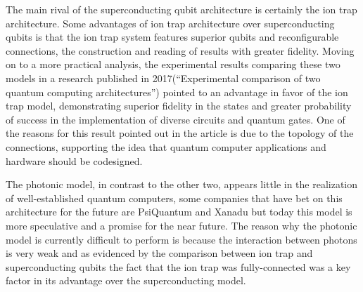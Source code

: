 \documentclass[
  journal=largetwo,
  year=2023,
]{cup-journal}
\begin{document}
The main rival of the superconducting qubit architecture is certainly the ion trap architecture. Some advantages of ion trap architecture over superconducting qubits is that the ion trap system features superior qubits and reconfigurable connections, the construction and reading of results with greater fidelity. Moving on to a more practical analysis, the experimental results comparing these two models in a research published in 2017(``Experimental comparison of two quantum computing architectures'') pointed to an advantage in favor of the ion trap model, demonstrating superior fidelity in the states and greater probability of success in the implementation of diverse circuits and quantum gates. One of the reasons for this result pointed out in the article is due to the topology of the connections, supporting the idea that quantum computer applications and hardware should be codesigned.~\autocite{linke_2017_experimental}


The photonic model, in contrast to the other two, appears little in the realization of well-established quantum computers, some companies that have bet on this architecture for the future are PsiQuantum and Xanadu but today this model is more speculative and a promise for the near future. The reason why the photonic model is currently difficult to perform is because the interaction between photons is very weak and as evidenced by the comparison between ion trap and superconducting qubits the fact that the ion trap was fully-connected was a key factor in its advantage over the superconducting model.
\end{document}
